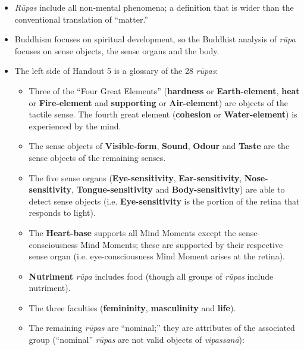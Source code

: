 \begin{itemize}

\item \textit{Rūpas} include all non-mental phenomena; a definition that is wider than the conventional translation of “matter.”

\item Buddhism focuses on spiritual development, so the Buddhist analysis of \textit{rūpa} focuses on sense objects, the sense organs and the body. 

\item The left side of Handout 5 is a glossary of the 28 \textit{rūpas}:

\begin{itemize}

\item Three of the “Four Great Elements” (\textbf{hardness} or \textbf{Earth-element}, \textbf{heat} or \textbf{Fire-element} and \textbf{supporting} or \textbf{Air-element}) are objects of the tactile sense. The fourth great element (\textbf{cohesion} or \textbf{Water-element}) is experienced by the mind.

\item The sense objects of \textbf{Visible-form}, \textbf{Sound}, \textbf{Odour} and \textbf{Taste} are the sense objects of the remaining senses.

\item The five sense organs (\textbf{Eye-sensitivity}, \textbf{Ear-sensitivity}, \textbf{Nose-sensitivity}, \textbf{Tongue-sensitivity} and \textbf{Body-sensitivity}) are able to detect sense objects (i.e. \textbf{Eye-sensitivity} is the portion of the retina that responds to light).

\item The \textbf{Heart-base} supports all Mind Moments except the sense-consciousness Mind Moments; these are supported by their respective sense organ (i.e. eye-consciousness Mind Moment arises at the retina).

\item \textbf{Nutriment} \textit{rūpa} includes food (though all groups of \textit{rūpas} include nutriment).

\item The three faculties (\textbf{femininity}, \textbf{masculinity} and \textbf{life}).

\item The remaining \textit{rūpas} are “nominal;” they are attributes of the associated group (“nominal” \textit{rūpas} are not valid objects of \textit{vipassanā}):


\end{itemize}
\end{itemize}
